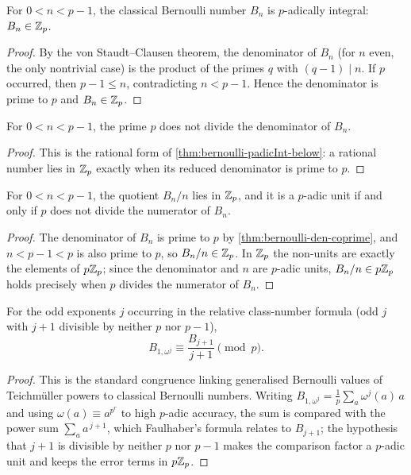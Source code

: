\begin{theorem}\label{thm:bernoulli-padicInt-below}
  \leanok
For $0<n<p-1$, the classical Bernoulli number $B_n$ is $p$-adically
integral: $B_n \in \mathbb{Z}_p$.
\end{theorem}
\begin{proof}\leanok
By the von Staudt--Clausen theorem, the denominator of $B_n$ (for $n$ even,
the only nontrivial case) is the product of the primes $q$ with
$(q-1)\mid n$.  If $p$ occurred, then $p - 1 \le n$, contradicting
$n < p-1$.  Hence the denominator is prime to $p$ and $B_n \in \mathbb{Z}_p$.
\end{proof}

\begin{theorem}\label{thm:bernoulli-den-coprime}
  \leanok
For $0<n<p-1$, the prime $p$ does not divide the denominator of $B_n$.
\end{theorem}
\begin{proof}\leanok
This is the rational form of \cref{thm:bernoulli-padicInt-below}: a
rational number lies in $\mathbb{Z}_p$ exactly when its reduced denominator is
prime to $p$.
\end{proof}

\begin{lemma}\label{lem:padic-bernoulli-factor}
  \leanok
For $0<n<p-1$, the quotient $B_n/n$ lies in $\mathbb{Z}_p$, and it is a $p$-adic
unit if and only if $p$ does not divide the numerator of $B_n$.
\end{lemma}
\begin{proof}\leanok
The denominator of $B_n$ is prime to $p$ by
\cref{thm:bernoulli-den-coprime}, and $n < p-1 < p$ is also prime to $p$,
so $B_n/n \in \mathbb{Z}_p$.  In $\mathbb{Z}_p$ the non-units are exactly the elements of
$p\mathbb{Z}_p$; since the denominator and $n$ are $p$-adic units, $B_n/n \in
p\mathbb{Z}_p$ holds precisely when $p$ divides the numerator of $B_n$.
\end{proof}

\begin{theorem}\label{thm:teichmuller-bernoulli-congruence}
  \leanok
For the odd exponents $j$ occurring in the relative class-number formula
(odd $j$ with $j + 1$ divisible by neither $p$ nor $p-1$),
\[
  B_{1,\omega^j}
  \equiv \frac{B_{j+1}}{j+1}\pmod p .
\]
\end{theorem}
\begin{proof}\leanok
This is the standard congruence linking generalised Bernoulli values of
Teichm\"uller powers to classical Bernoulli numbers.  Writing
$B_{1,\omega^j} = \tfrac1p \sum_a \omega^j(a)\,a$ and using
$\omega(a) \equiv a^{p^r}$ to high $p$-adic accuracy, the sum is compared
with the power sum $\sum_a a^{\,j+1}$, which Faulhaber's formula relates to
$B_{j+1}$; the hypothesis that $j+1$ is divisible by neither $p$ nor $p-1$
makes the comparison factor a $p$-adic unit and keeps the error terms in
$p\mathbb{Z}_p$.
\end{proof}

